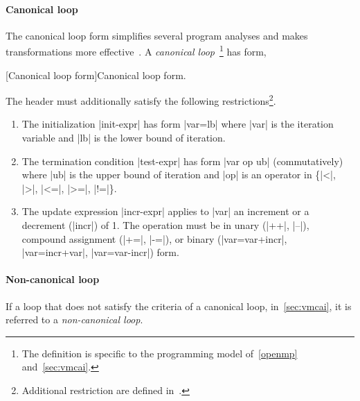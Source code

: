 \paragraph*{Canonical loop}
The canonical loop form simplifies several program analyses and makes transformations more effective~\cite{llvm_loops}.
A \emph{canonical loop}~\cite[p. 196--202]{openmp_api}\footnote{
The definition is specific to the programming model of~\autoref{openmp} and~\autoref{sec:vmcai}.} has form,
\begin{center}
\begin{minipage}{\textwidth}
\captionsetup{type=lstlisting}
[Canonical loop form]{Canonical loop form.}
\label{lst:canonical}
\end{minipage}
\end{center}
The header must additionally satisfy the following restrictions\footnote{
Additional restriction are defined in~\cite[p. 201]{openmp_api}.}.
\begin{enumerate}
\item The initialization \pr|init-expr| has form \pr|var=lb| where \pr|var| is the iteration variable and \pr|lb| is the lower bound of iteration.
\item The termination condition \pr|test-expr| has form \pr|var op ub| (commutatively)
    where \pr|ub| is the upper bound of iteration and \pr|op| is an operator in \{\pr|<|, \pr|>|, \pr|<=|, \pr|>=|, \pr|!=|\}.
\item The update expression \pr|incr-expr| applies to \pr|var| an increment or a decrement (\pr|incr|) of 1.
The operation must be in unary (\pr|++|, \pr|--|), compound assignment (\pr|+=|, \pr|-=|), or
binary (\pr|var=var+incr|, \pr|var=incr+var|, \pr|var=var-incr|) form.
\end{enumerate}

\paragraph*{Non-canonical loop}
If a loop that does not satisfy the criteria of a canonical loop, in~\autoref{sec:vmcai}, it is referred to a \emph{non-canonical loop}.


